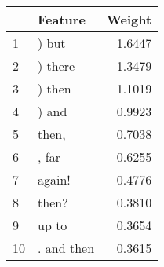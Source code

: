 \begin{tabular}{llr}
\toprule
{} &     Feature &  Weight \\
\midrule
1  &       ) but &  1.6447 \\
2  &     ) there &  1.3479 \\
3  &      ) then &  1.1019 \\
4  &       ) and &  0.9923 \\
5  &       then, &  0.7038 \\
6  &       , far &  0.6255 \\
7  &      again! &  0.4776 \\
8  &       then? &  0.3810 \\
9  &       up to &  0.3654 \\
10 &  . and then &  0.3615 \\
\bottomrule
\end{tabular}
